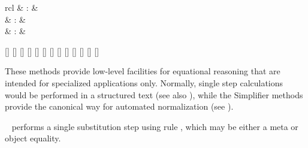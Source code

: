 \begin{isabellebody}
\begin{isamarkuptext}
\begin{description}
  \end{description}%
\end{isamarkuptext}%
\isamarkuptrue%
%
\isamarkuptrue%
%
\begin{isamarkuptext}%
\begin{matharray}{rcl}
    \hypertarget{method.subst}{\hyperlink{method.subst}{\mbox{}}} & : &  \\
    \hypertarget{method.hypsubst}{\hyperlink{method.hypsubst}{\mbox{}}} & : &  \\
    \hypertarget{method.split}{\hyperlink{method.split}{\mbox{}}} & : &  \\
  \end{matharray}

  \begin{railoutput}
[]
\rail@bar
{}
[]
[]
[]
\rail@endbar
\rail@bar
{}
[]
\rail@plus
{}[]
\rail@endplus
{}[]
\rail@endbar
{}[]
\rail@end
{}
[]
\rail@bar
{}
[]
[]
[]
\rail@endbar
{}[]
\rail@end
\end{railoutput}


  These methods provide low-level facilities for equational reasoning
  that are intended for specialized applications only.  Normally,
  single step calculations would be performed in a structured text
  (see also ), while the Simplifier methods
  provide the canonical way for automated normalization (see
  ).

  \begin{description}

  \item \hyperlink{method.subst}{\mbox{}}~ performs a single substitution step
  using rule , which may be either a meta or object
  equality.


\end{description}
\end{isamarkuptext}
\end{isabellebody}
